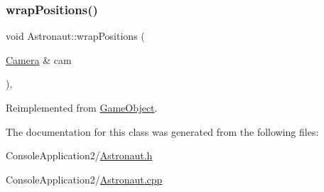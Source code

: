 \hypertarget{class_astronaut_ab552db56a9d7341b3ce8f8a9b3670004}{}\label{class_astronaut_ab552db56a9d7341b3ce8f8a9b3670004} 
\subsubsection{\texorpdfstring{wrap\+Positions()}{wrapPositions()}}
{\footnotesize\ttfamily void Astronaut\+::wrap\+Positions (\begin{DoxyParamCaption}\item[{\hyperlink{class_camera}{Camera} \&}]{cam }\end{DoxyParamCaption})\hspace{0.3cm}{\ttfamily [override]}, {\ttfamily [virtual]}}



Reimplemented from \hyperlink{class_game_object_a53b129d55688652e25e6515d80e669ca}{Game\+Object}.



The documentation for this class was generated from the following files\+:\begin{DoxyCompactItemize}
\item 
Console\+Application2/\hyperlink{_astronaut_8h}{Astronaut.\+h}\item 
Console\+Application2/\hyperlink{_astronaut_8cpp}{Astronaut.\+cpp}\end{DoxyCompactItemize}
